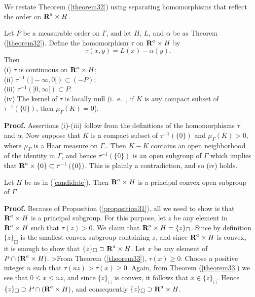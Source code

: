 We restate Theorem (\ref{theorem32}) 
using separating homomorphisms that 
reflect the 
order on $\R^a\times H$.
%
\begin{theorem33}
Let $P$ be a measurable order on $\Gamma$, 
and let $H$, $L$, and $\alpha$ be as 
Theorem (\ref{theorem32}).  
%
Define the homomorphism $\tau$ on $\R^a\times H$ by\\
$$\tau (x,y) = L(x)- \alpha (y).$$
Then\\
%
(i)  $\tau$ is continuous on $\R^a\times H$;\\
%
(ii)
$\tau^{-1}\left(]-\infty,0[\right) \subset (-P);$\\
%
(iii)
$\tau^{-1}\left(]0,\infty[\right) \subset P.$\\
%
(iv)  The kernel of $\tau$ is locally null (i.\ e.\ , if $K$ is any compact subset of $\tau ^{-1}\left(\{0\}\right)$, then $\mu_\Gamma (K)=0$).
\label{theorem33}
\end{theorem33}
%
%
%
{\bf Proof.}  Assertions (i)-(iii) follow from the 
definitions of the homomorphisms $\tau$ and $\alpha$.  
%
Now suppose that 
$K$ is a compact subset of 
$\tau ^{-1}\left(\{0\}\right)$ and $\mu_\Gamma (K)>0$,
where $\mu_\Gamma$ is a Haar measure on $\Gamma$..  
%
Then $K-K$ contains an open neighborhood 
of the identity in $\Gamma$, and hence 
$\tau ^{-1}\left(\{0\}\right)$ is 
an open subgroup of $\Gamma$ which 
implies that 
$\R^a\times\{0\}\subset \tau ^{-1}\left(\{0\}\right)$.  
%
This is plainly a contradiction, and so (iv) holds.\\

  

  




\begin{theorem34}
Let $H$ be as in (\ref{candidate}).  
Then $\R^a\times H$ is a principal convex
 open subgroup of $\Gamma$.
\label{theorem34}
\end{theorem34}
%
%
%
{\bf Proof.}  Because of Proposition (\ref{proposition31}), 
all we need to show is that $\R^a\times H$ 
is a principal subgroup.  
%
For this purpose, let $z$ be any element 
in $\R^a\times H$ such that $\tau (z) >0$.  
%
We claim that $\R^a\times H=\{z\}_\Box$.  
%
Since by definition $\{z\}_\Box$ is the smallest 
convex subgroup containing $z$, and since 
$\R^a\times H$ is convex, it is 
enough to show that 
$\{z\}_\Box\supset \R^a\times H$.  
%
Let $x$ be any element of $P\cap (\R^a\times H)$.  
%
>From Theorem (\ref{theorem33}), $\tau (x)\geq 0$.  
%
Choose a positive integer 
$n$ such that $\tau (n z ) > \tau (x) \geq 0$.  
%
Again, from Theorem (\ref{theorem33}) 
we see that $0\leq x\leq n z$, and since 
$\{z\}_\Box$ is convex, it follows 
that $x\in \{z\}_\Box$.  
%
Hence $\{z\}_\Box\supset P\cap (\R^a\times H)$, 
and consequently $\{z\}_\Box\supset \R^a\times H$.\\ 
%
%
%

